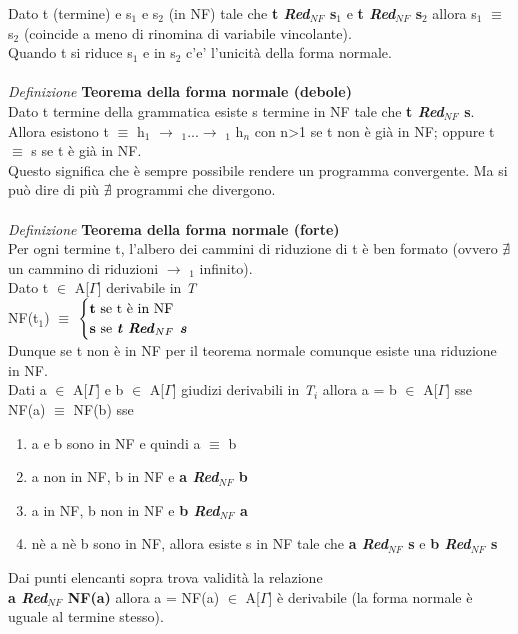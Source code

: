 \documentclass[10pt,a4paper, italian]{book}
\begin{document}
{{Dato t (termine) e s$_1$ e s$_2$ (in NF) tale che \textbf{t \textit{Red$_{NF}$ }s$_1$} e \textbf{t \textit{Red$_{NF}$} s$_2$} allora s$_1$ $\equiv$ s$_2$ (coincide a meno di rinomina di variabile  vincolante).\\
Quando t si riduce s$_1$ e in s$_2$ c'e' l'unicit\`a della forma normale.
\\\\
\noindent
\textit{Definizione} \textbf{Teorema della forma normale (debole)}\\
Dato t termine della grammatica esiste s termine in NF tale che \textbf{t \textit{Red$_{NF}$ }s}. Allora esistono t $\equiv$ h$_1$ $\rightarrow$ $_1$...$\rightarrow$ $_1$ h$_n$ con n>1 se t non \`e gi\`a in NF; oppure t $\equiv$ s se t \`e gi\`a in NF.\\
Questo significa che \`e sempre possibile rendere un programma convergente. Ma si pu\`o dire di pi\`u $\nexists$ programmi che divergono. 
\\\\
\noindent
\textit{Definizione} \textbf{Teorema della forma normale (forte)}\\
Per ogni termine t, l'albero dei cammini di riduzione di t \`e ben formato (ovvero $\nexists$ un cammino di riduzioni $\rightarrow$ $_1$ infinito).\\
Dato t $\in$ A[$\Gamma$] derivabile in \textit{T}\\
NF(t$_1$) $\equiv$
$
\begin{cases}
\text{\textbf{t} se t è in NF} \\
\text{\textbf{s} se \textit{\textbf{t Red}}}_{NF} \text{\textit{\textbf{ s}}}
\end{cases}
$
\\
Dunque se t non \`e in NF per il teorema normale comunque esiste una riduzione in NF.\\
Dati a $\in$ A[$\Gamma$] e b $\in$ A[$\Gamma$] giudizi derivabili in \textit{T$_i$} allora a = b $\in$ A[$\Gamma$] sse NF(a) $\equiv$ NF(b) sse
\begin{enumerate}
\item a e b sono in NF e quindi a $\equiv$ b
\item a non in NF, b in NF e \textbf{a \textit{Red$_{NF}$ }b}
\item a in NF, b non in NF e \textbf{b \textit{Red$_{NF}$ }a}
\item n\`e a n\`e b sono in NF, allora esiste s in NF tale che \textbf{a \textit{Red$_{NF}$ }s} e \textbf{b \textit{Red$_{NF}$ }s}
\end{enumerate}
Dai punti elencanti sopra trova validit\`a la relazione\\\textbf{a \textit{Red$_{NF}$ }NF(a)} allora a = NF(a) $\in$ A[$\Gamma$] \`e derivabile (la forma normale \`e uguale al termine stesso).

}}
\end{document}

